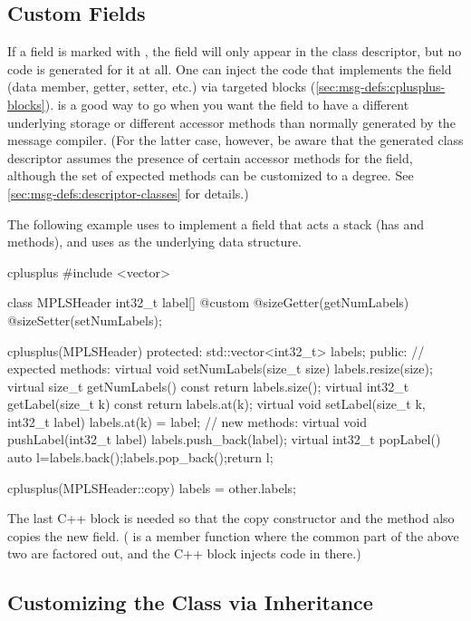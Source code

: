 \subsection{Custom Fields}
\label{sec:msg-defs:custom-fields}

If a field is marked with , the field will only appear in the
class descriptor, but no code is generated for it at all. One can inject the
code that implements the field (data member, getter, setter, etc.) via targeted
 blocks (\ref{sec:msg-defs:cplusplus-blocks}).
 is a good way to go when you want the field to have a different
underlying storage or different accessor methods than normally generated by the
message compiler. (For the latter case, however, be aware that the generated
class descriptor assumes the presence of certain accessor methods for the
field, although the set of expected methods can be customized to a degree. See
\ref{sec:msg-defs:descriptor-classes} for details.)

The following example uses  to implement a field that acts a
stack (has  and  methods), and uses  as
the underlying data structure.

\begin{msg}
cplusplus {{
#include <vector>
}}

class MPLSHeader
{
    int32_t label[] @custom @sizeGetter(getNumLabels) @sizeSetter(setNumLabels);
}

cplusplus(MPLSHeader) {{
  protected:
    std::vector<int32_t> labels;
  public:
    // expected methods:
    virtual void setNumLabels(size_t size) {labels.resize(size);}
    virtual size_t getNumLabels() const {return labels.size();}
    virtual int32_t getLabel(size_t k) const {return labels.at(k);}
    virtual void setLabel(size_t k, int32_t label) {labels.at(k) = label;}
    // new methods:
    virtual void pushLabel(int32_t label) {labels.push_back(label);}
    virtual int32_t popLabel() {auto l=labels.back();labels.pop_back();return l;}
}}

cplusplus(MPLSHeader::copy) {{
    labels = other.labels;
}}
\end{msg}

The last C++ block is needed so that the copy constructor and the
 method also copies the new field. ( is a member
function where the common part of the above two are factored out, and the C++
block injects code in there.)


\subsection{Customizing the Class via Inheritance}
\label{sec:msg-defs:customizing-via-inheritance}

